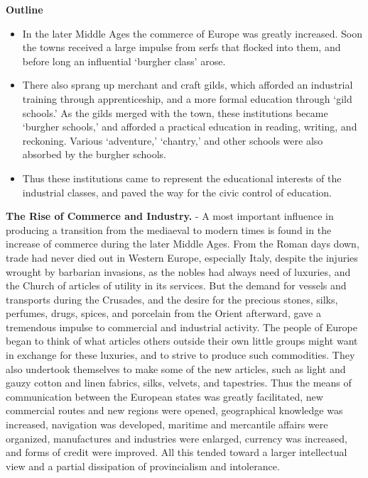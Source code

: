 \documentclass[
]{book}
\providecommand{\tightlist}{%
  \setlength{\itemsep}{0pt}\setlength{\parskip}{0pt}}
\begin{document}
\textbf{Outline}

\begin{itemize}
\tightlist
\item
  In the later Middle Ages the commerce of Europe was greatly increased. Soon the towns received a large impulse from serfs that flocked into them, and before long an influential `burgher class' arose.
\item
  There also sprang up merchant and craft gilds, which afforded an industrial training through apprenticeship, and a more formal education through `gild schools.' As the gilds merged with the town, these institutions became `burgher schools,' and afforded a practical education in reading, writing, and reckoning. Various `adventure,' `chantry,' and other schools were also absorbed by the burgher schools.
\item
  Thus these institutions came to represent the educational interests of the industrial classes, and paved the way for the civic control of education.
\end{itemize}

\textbf{The Rise of Commerce and Industry.} - A most important influence in producing a transition from the mediaeval to modern times is found in the increase of commerce during the later Middle Ages. From the Roman days down, trade had never died out in Western Europe, especially Italy, despite the injuries wrought by barbarian invasions, as the nobles had always need of luxuries, and the Church of articles of utility in its services. But the demand for vessels and transports during the Crusades, and the desire for the precious stones, silks, perfumes, drugs, spices, and porcelain from the Orient afterward, gave a tremendous impulse to commercial and industrial activity. The people of Europe began to think of what articles others outside their own little groups might want in exchange for these luxuries, and to strive to produce such commodities. They also undertook themselves to make some of the new articles, such as light and gauzy cotton and linen fabrics, silks, velvets, and tapestries. Thus the means of communication between the European states was greatly facilitated, new commercial routes and new regions were opened, geographical knowledge was increased, navigation was developed, maritime and mercantile affairs were organized, manufactures and industries were enlarged, currency was increased, and forms of credit were improved. All this tended toward a larger intellectual view and a partial dissipation of provincialism and intolerance.
\end{document}
